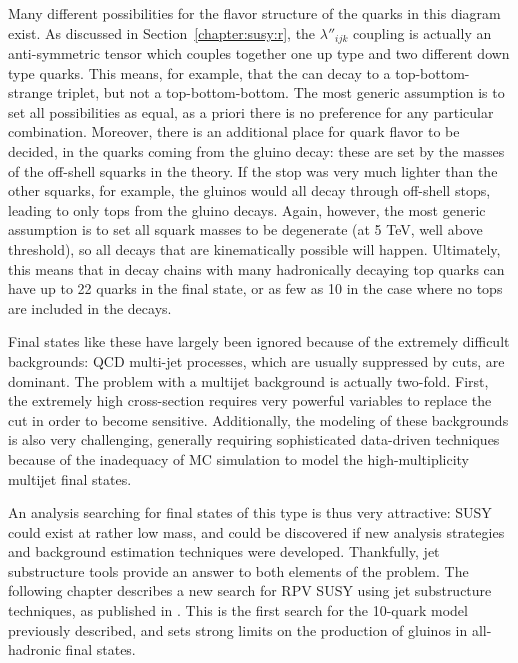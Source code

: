 Many different possibilities for the flavor structure of the quarks in this diagram exist. As discussed in Section~\ref{chapter:susy:r}, the  $\lambda''_{ijk}$ coupling is actually an anti-symmetric tensor which couples together one up type and two different down type quarks. This means, for example, that the \lsp can decay to a top-bottom-strange triplet, but not a top-bottom-bottom. The most generic assumption is to set all possibilities as equal, as a priori there is no preference for any particular combination. Moreover, there is an additional place for quark flavor to be decided, in the quarks coming from the gluino decay: these are set by the masses of the off-shell squarks in the theory. If the stop was very much lighter than the other squarks, for example, the gluinos would all decay through off-shell stops, leading to only tops from the gluino decays. Again, however, the most generic assumption is to set all squark masses to be degenerate (at 5 TeV, well above threshold), so all decays that are kinematically possible will happen. Ultimately, this means that in decay chains with many hadronically decaying top quarks can have up to 22 quarks in the final state, or as few as 10 in the case where no tops are included in the decays. 

Final states like these have largely been ignored because of the extremely difficult backgrounds: QCD multi-jet processes, which are usually suppressed by \met cuts, are dominant. The problem with a multijet background is actually two-fold. First, the extremely high cross-section requires very powerful variables to replace the \met cut in order to become sensitive. Additionally, the modeling of these backgrounds is also very challenging, generally requiring sophisticated data-driven techniques because of the inadequacy of MC simulation to model the high-multiplicity multijet final states.

An analysis searching for final states of this type is thus very attractive: SUSY could exist at rather low mass, and could be discovered if new analysis strategies and background estimation techniques were developed. Thankfully, jet substructure tools provide an answer to both elements of the problem. The following chapter describes a new search for RPV SUSY using jet substructure techniques, as published in \cite{RPVSUSY}. This is the first search for the 10-quark model previously described, and sets strong limits on the production of gluinos in all-hadronic final states.


